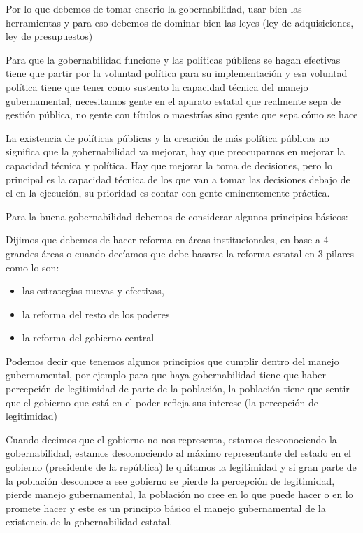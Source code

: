 \documentclass[
  jou,
  floatsintext,
  longtable,
  a4paper,
  nolmodern,
  notxfonts,
  notimes,
  12pt,
  colorlinks=true,linkcolor=blue,citecolor=blue,urlcolor=blue]{apa7}
\providecommand{\tightlist}{%
  \setlength{\itemsep}{0pt}\setlength{\parskip}{0pt}}
\begin{document}
Por lo que debemos de tomar enserio la gobernabilidad, usar bien las
herramientas y para eso debemos de dominar bien las leyes (ley de
adquisiciones, ley de presupuestos)

Para que la gobernabilidad funcione y las políticas públicas se hagan
efectivas tiene que partir por la voluntad política para su
implementación y esa voluntad política tiene que tener como sustento la
capacidad técnica del manejo gubernamental, necesitamos gente en el
aparato estatal que realmente sepa de gestión pública, no gente con
títulos o maestrías sino gente que sepa cómo se hace

La existencia de políticas públicas y la creación de más política
públicas no significa que la gobernabilidad va mejorar, hay que
preocuparnos en mejorar la capacidad técnica y política. Hay que mejorar
la toma de decisiones, pero lo principal es la capacidad técnica de los
que van a tomar las decisiones debajo de el en la ejecución, su
prioridad es contar con gente eminentemente práctica.

Para la buena gobernabilidad debemos de considerar algunos principios
básicos:

Dijimos que debemos de hacer reforma en áreas institucionales, en base a
4 grandes áreas o cuando decíamos que debe basarse la reforma estatal en
3 pilares como lo son:

\begin{itemize}
\tightlist
\item
  las estrategias nuevas y efectivas,
\item
  la reforma del resto de los poderes
\item
  la reforma del gobierno central
\end{itemize}

Podemos decir que tenemos algunos principios que cumplir dentro del
manejo gubernamental, por ejemplo para que haya gobernabilidad tiene que
haber percepción de legitimidad de parte de la población, la población
tiene que sentir que el gobierno que está en el poder refleja sus
interese (la percepción de legitimidad)

Cuando decimos que el gobierno no nos representa, estamos desconociendo
la gobernabilidad, estamos desconociendo al máximo representante del
estado en el gobierno (presidente de la república) le quitamos la
legitimidad y si gran parte de la población desconoce a ese gobierno se
pierde la percepción de legitimidad, pierde manejo gubernamental, la
población no cree en lo que puede hacer o en lo promete hacer y este es
un principio básico el manejo gubernamental de la existencia de la
gobernabilidad estatal.
\end{document}
